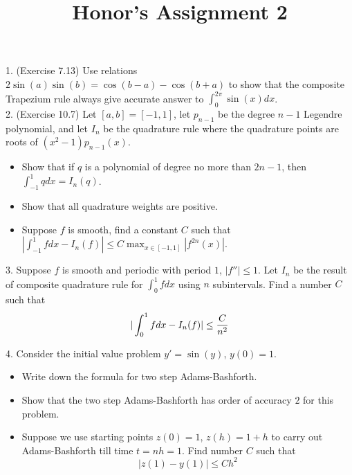 \documentclass[20pt]{article} %
\title{Honor's Assignment 2}
\theoremstyle{break}
\begin{document}
\maketitle

1. (Exercise 7.13) Use relations $2\sin(a)\sin(b)=\cos(b-a)-\cos(b+a)$ to show that the composite Trapezium rule always give accurate answer to $\int_0^{2\pi}\sin(x)dx$.\\  

2. (Exercise 10.7) Let $[a, b]=[-1, 1]$, let $p_{n-1}$ be the degree $n-1$ Legendre polynomial, and let $I_n$ be the quadrature rule where the quadrature points are roots of $(x^2-1)p_{n-1}(x)$.
\begin{itemize}
\item Show that if $q$ is a polynomial of degree no more than $2n-1$, then $\int_{-1}^1qdx=I_n(q)$.
\item Show that all quadrature weights are positive.
\item Suppose $f$ is smooth, find a constant $C$ such that $|\int_{-1}^1fdx-I_n(f)|\leq C\max_{x\in [-1, 1]}|f^{2n}(x)|$.
\end{itemize}

3. Suppose $f$ is smooth and periodic with period $1$, $|f''|\leq 1$. Let $I_n$ be the result of composite quadrature rule for $\int_0^1fdx$ using $n$ subintervals. Find a number $C$ such that
\[|\int_0^1fdx-I_n(f)|\leq {C\over n^2}\]

4. Consider the initial value problem $y'=\sin(y)$, $y(0)=1$.

\begin{itemize}
\item Write down the formula for two step Adams-Bashforth.
\item Show that the two step Adams-Bashforth has order of accuracy $2$ for this problem.
\item Suppose we use starting points $z(0)=1$, $z(h)=1+h$ to carry out Adams-Bashforth till time $t=nh=1$. Find number $C$ such that
  \[|z(1)-y(1)|\leq Ch^2\]
\end{itemize}
\end{document}
